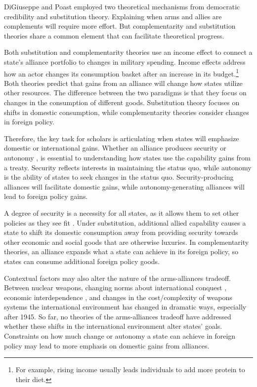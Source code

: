 \documentclass[12pt]{article}
\begin{document}
DiGiuseppe and Poast employed two theoretical mechanisms from democratic credibility and substitution theory. Explaining when arms and allies are complements will require more effort. But complementarity and substitution theories share a common element that can facilitate theoretical progress. 

Both substitution and complementarity theories use an income effect to connect a state's alliance portfolio to changes in military spending. Income effects address how an actor changes its consumption basket after an increase in its budget.\footnote{For example, rising income usually leads individuals to add more protein to their diet.} Both theories predict that gains from an alliance will change how states utilize other resources. The difference between the two paradigms is that they focus on changes in the consumption of different goods. Substitution theory focuses on shifts in domestic consumption, while complementarity theories consider changes in foreign policy. 

Therefore, the key task for scholars is articulating when states will emphasize domestic or international gains. Whether an alliance produces security or autonomy \citep{Morrow1991}, is essential to understanding how states use the capability gains from a treaty. Security reflects interests in maintaining the status quo, while autonomy is the ability of states to seek changes in the status quo. Security-producing alliances will facilitate domestic gains, while autonomy-generating alliances will lead to foreign policy gains. 

A degree of security is a necessity for all states, as it allows them to set other policies as they see fit \citep{Lake1996}. Under substitution, additional allied capability causes a state to shift its domestic consumption away from providing security towards other economic and social goods that are otherwise luxuries. In complementarity theories, an alliance expands what a state can achieve in its foreign policy, so states can consume additional foreign policy goods. 

Contextual factors may also alter the nature of the arms-alliances tradeoff. Between nuclear weapons, changing norms about international conquest \citep{Fazal2011}, economic interdependence \citep{Frieden2006}, and changes in the cost/complexity of weapons systems \citep{Bitzinger2003} the international environment has changed in dramatic ways, especially after 1945. So far, no theories of the arms-alliances tradeoff have addressed whether these shifts in the international environment alter states' goals. Constraints on how much change or autonomy a state can achieve in foreign policy may lead to more emphasis on domestic gains from alliances.   
\end{document}
